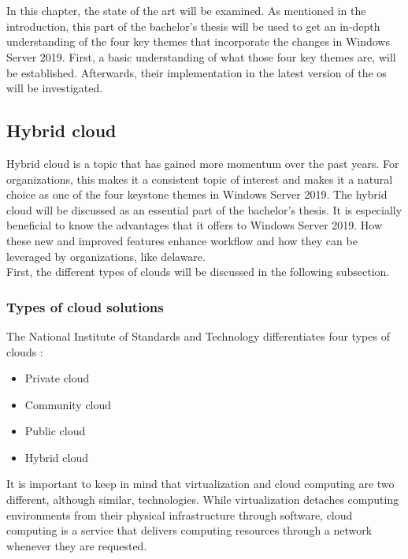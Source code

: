 \chapter{}
\label{ch:stand-van-zaken}
In this chapter, the state of the art will be examined. 
As mentioned in the introduction, this part of the bachelor's thesis will be used to get an in-depth understanding of the four key themes that incorporate the changes in Windows Server 2019. 
First, a basic understanding of what those four key themes are, will be established. 
Afterwards, their implementation in the latest version of the \acrshort{os} will be investigated.

\section{Hybrid cloud}
Hybrid cloud is a topic that has gained more momentum over the past years. 
For organizations, this makes it a consistent topic of interest and makes it a natural choice as one of the four keystone themes in Windows Server 2019. \autocite{MWST2018} 
The hybrid cloud will be discussed as an essential part of the bachelor's thesis. 
It is especially beneficial to know the advantages that it offers to Windows Server 2019.
How these new and improved features enhance workflow and how they can be leveraged by organizations, like delaware. \\
First, the different types of clouds will be discussed in the following subsection.

\subsection{Types of cloud solutions}
\label{subsection:typesofcloud}
The National Institute of Standards and Technology differentiates four types of clouds \autocite{Mell2011}:
\begin{itemize}
	\item Private cloud
	\item Community cloud
	\item Public cloud
	\item Hybrid cloud
\end{itemize}	
It is important to keep in mind that virtualization and cloud computing are two different, although similar, technologies. 
While virtualization detaches computing environments from their physical infrastructure through software, cloud computing is a service that delivers computing resources through a network whenever they are requested. \autocite{Naeem2016}

